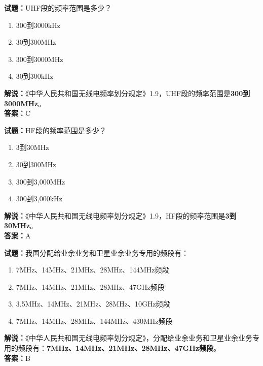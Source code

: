 \documentclass{ctexbook}
\begin{document}
\bigskip


\noindent\textbf{试题：}UHF段的频率范围是多少？
\begin{enumerate}[leftmargin=3em]
	\item 300到3000\si{\kHz}
	\item 30到300\si{\MHz}
	\item 300到3000\si{\MHz}
	\item 30到300\si{\kHz}
\end{enumerate}
\noindent\textbf{解说：}《中华人民共和国无线电频率划分规定》1.9，UHF段的频率范围是\textbf{300到3000\si{\MHz}}。\\\noindent\textbf{答案：}C


\bigskip


\noindent\textbf{试题：}HF段的频率范围是多少？
\begin{enumerate}[leftmargin=3em]
	\item 3到30\si{\MHz}
	\item 30到300\si{\MHz}
	\item 300到3,000\si{\MHz}
	\item 300到3,000\si{\kHz}
\end{enumerate}
\noindent\textbf{解说：}《中华人民共和国无线电频率划分规定》1.9，HF段的频率范围是\textbf{3到30\si{\MHz}}。\\\noindent\textbf{答案：}A


\bigskip


\noindent\textbf{试题：}我国分配给业余业务和卫星业余业务专用的频段有：
\begin{enumerate}[leftmargin=3em]
	\item 7\si{\MHz}、14\si{\MHz}、21\si{\MHz}、28\si{\MHz}、144\si{\MHz}频段
	\item 7\si{\MHz}、14\si{\MHz}、21\si{\MHz}、28\si{\MHz}、47\si{\GHz}频段
	\item 3.5\si{\MHz}、14\si{\MHz}、21\si{\MHz}、28\si{\MHz}、10\si{\GHz}频段
	\item 7\si{\MHz}、14\si{\MHz}、28\si{\MHz}、144\si{\MHz}、430\si{\MHz}频段
\end{enumerate}
\noindent\textbf{解说：}《中华人民共和国无线电频率划分规定》，分配给业余业务和卫星业余业务专用的频段有：\textbf{7\si{\MHz}、14\si{\MHz}、21\si{\MHz}、28\si{\MHz}、47\si{\GHz}频段}。\\\noindent\textbf{答案：}B


\bigskip
\end{document}
